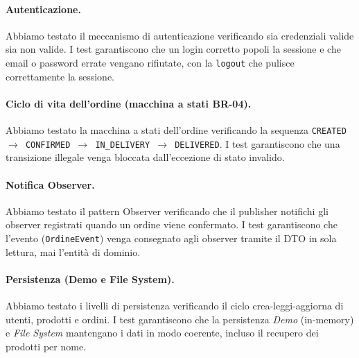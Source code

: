 \paragraph{Autenticazione.} Abbiamo testato il meccanismo di autenticazione
verificando sia credenziali valide sia non valide. I test garantiscono che un
login corretto popoli la sessione e che email o password errate vengano
rifiutate, con la \texttt{logout} che pulisce correttamente la sessione.

\paragraph{Ciclo di vita dell'ordine (macchina a stati BR-04).} Abbiamo testato
la macchina a stati dell'ordine verificando la sequenza \texttt{CREATED
$\rightarrow$ CONFIRMED $\rightarrow$ IN\_DELIVERY $\rightarrow$ DELIVERED}.
I test garantiscono che una transizione illegale venga bloccata
dall'eccezione di stato invalido.

\paragraph{Notifica Observer.} Abbiamo testato il pattern Observer verificando
che il publisher notifichi gli observer registrati quando un ordine viene
confermato. I test garantiscono che l'evento (\texttt{OrdineEvent}) venga
consegnato agli observer tramite il DTO in sola lettura, mai l'entità di
dominio.

\paragraph{Persistenza (Demo e File System).} Abbiamo testato i livelli di
persistenza verificando il ciclo crea-leggi-aggiorna di utenti, prodotti e
ordini. I test garantiscono che la persistenza \emph{Demo} (in-memory) e
\emph{File System} mantengano i dati in modo coerente, incluso il recupero dei
prodotti per nome.
